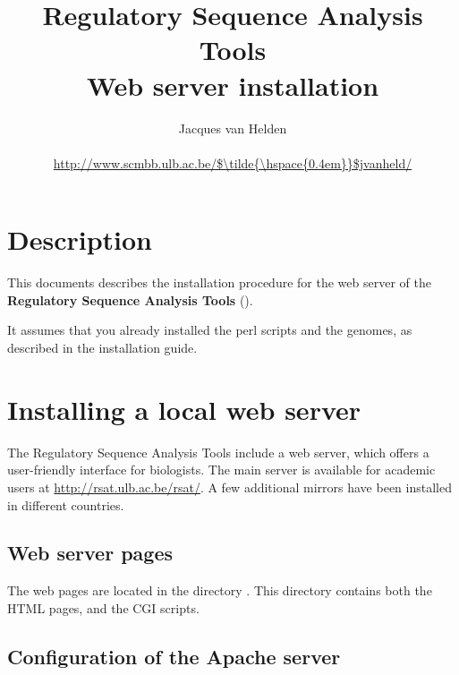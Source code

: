 \documentclass{article}
\begin{document}
\title{Regulatory Sequence Analysis Tools \\
Web server installation}

\author{
	Jacques van Helden \\
	 \\
	\url{http://www.scmbb.ulb.ac.be/$\tilde{\hspace{0.4em}}$jvanheld/} \\
	\scmb 
}


\maketitle

\newpage
\tableofcontents
\newpage

\section{Description}

This documents describes the installation procedure for the web server
of the \textbf{Regulatory Sequence Analysis Tools} (\RSAT).

It assumes that you already installed the perl scripts and the
genomes, as described in the \RSAT installation guide.


\section{Installing a local web server}

The Regulatory Sequence Analysis Tools include a web server, which
offers a user-friendly interface for biologists. The main server is
available for academic users at \url{http://rsat.ulb.ac.be/rsat/}. A
few additional mirrors have been installed in different countries.

\subsection{Web server pages}

The web pages are located in the directory
. This directory contains both the HTML
pages, and the CGI scripts.

\subsection{Configuration of the Apache server}
\end{document}
